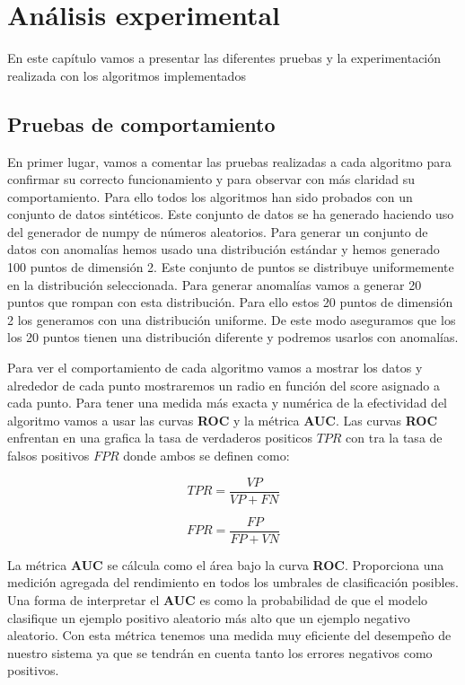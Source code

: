 \chapter{Análisis experimental}
En este capítulo vamos a presentar las diferentes pruebas y la experimentación
realizada con los algoritmos implementados

\section{Pruebas de comportamiento}
En primer lugar, vamos a comentar las pruebas realizadas a cada algoritmo
para confirmar su correcto funcionamiento y para observar con más claridad
su comportamiento. Para ello todos los algoritmos han sido probados con un
conjunto de datos sintéticos. Este conjunto de datos se ha generado haciendo
uso del generador de numpy de números aleatorios. Para generar un conjunto
de datos con anomalías hemos usado una distribución estándar y hemos generado 
100 puntos de dimensión 2. Este conjunto de puntos se distribuye uniformemente
en la distribución seleccionada. Para generar anomalías vamos a generar 20
puntos que rompan con esta distribución. Para ello estos 20 puntos de dimensión
2 los generamos con una distribución uniforme. De este modo aseguramos que los 
los 20 puntos tienen una distribución diferente y podremos usarlos con anomalías.

Para ver el comportamiento de cada algoritmo vamos a mostrar los datos y 
alrededor de cada punto mostraremos un radio en función del score asignado a
cada punto. Para tener una medida más exacta y numérica de la efectividad del
algoritmo vamos a usar las curvas \textbf{ROC} y la métrica \textbf{AUC}.
Las curvas \textbf{ROC} enfrentan en una grafica la tasa de verdaderos
positicos $TPR$ con tra la tasa de falsos positivos $FPR$ donde ambos se definen como:

\[ TPR = \frac{VP}{VP + FN}\]

\[FPR = \frac{FP}{FP +VN}\]

La métrica \textbf{AUC} se cálcula como el área bajo la curva \textbf{ROC}. Proporciona 
una medición agregada del rendimiento en todos los umbrales de clasificación 
posibles. Una forma de interpretar el \textbf{AUC} es como la probabilidad de 
que el modelo clasifique un ejemplo positivo aleatorio más alto que un ejemplo 
negativo aleatorio.
Con esta métrica tenemos una medida muy eficiente del desempeño de nuestro
sistema ya que se tendrán en cuenta tanto los errores negativos como positivos.

